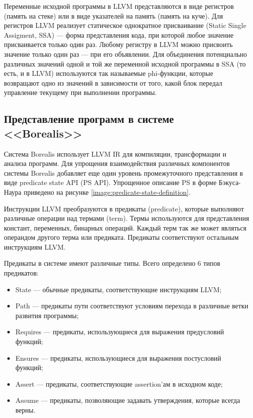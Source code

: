 Переменные исходной программы в LLVM представляются в виде регистров (память на стеке) или в виде указателей на память (память на куче). Для регистров LLVM реализует статическое однократное присваивание (Static Single Assigment, SSA) --- форма представления кода, при которой любое значение присваивается только один раз. Любому регистру в LLVM можно присвоить значение только один раз --- при его объявлении. Для объединения потенциально различных значений одной и той же переменной исходной программы в SSA (то есть, и в LLVM) используются так называемые phi-функции, которые возвращают одно из значений в зависимости от того, какой блок передал управление текущему при выполнении программы.

\subsection{Представление программ в системе <<Borealis>>}
Система Borealis использует LLVM IR для компиляции, трансформации и анализа программ. Для упрощения взаимодействия различных компонентов системы Borealis добавляет еще один уровень промежуточного представления в виде predicate state API (PS API). Упрощенное описание PS в форме Бэкуса-Наура приведено на рисунке \ref{image:predicate-state-definition}.
	
Инструкции LLVM преобразуются в предикаты (predicate), которые выполняют различные операции над термами (term). Термы используются для представления констант, переменных, бинарных операций. Каждый терм так же может являться операндом другого терма или предиката. Предикаты соответствуют остальным инструкциям LLVM.
	
Предикаты в системе имеют различные типы. Всего определено 6 типов предикатов:
\begin{itemize}
\item State --- обычные предикаты, соответствующие инструкциям LLVM;
\item Path --- предикаты пути соответствуют условиям перехода в различные ветки развития программы;
\item Requires --- предикаты, использующиеся для выражения предусловий функций;
\item Ensures --- предикаты, использующиеся для выражения постусловий функций;
\item Assert --- предикаты, соответствующие assertion'ам в исходном коде;
\item Assume --- предикаты, позволяющие задавать утверждения, которые всегда верны.
\end{itemize}


